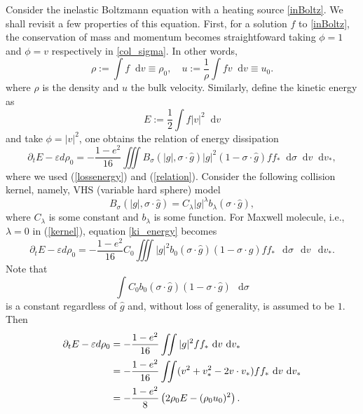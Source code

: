 \documentclass[review, times]{elsarticle}
\newcommand*\diff{\mathop{}\!\mathrm{d}}
\begin{document}
Consider the inelastic Boltzmann equation with a heating source \eqref{inBoltz}. We shall revisit a few properties of this equation. First, for a solution $f$ to \eqref{inBoltz}, the conservation of mass and momentum becomes straightfoward taking $\phi = 1$ and $\phi = v$ respectively in \eqref{col_sigma}. In other words,
\begin{equation}
\rho := \int f\diff{v}\equiv \rho_0, \quad  u :=\frac{1}{\rho}\int fv \diff{v}\equiv u_0.
\end{equation}
where $\rho$ is the density and $u$ the bulk velocity. Similarly, define the kinetic energy as
\begin{equation}
  E := \frac{1}{2}\int f |v|^2\diff v
\end{equation}
and take $\phi = |v|^2$, one obtains the relation of energy dissipation
\begin{equation}\label{ki_energy}
\partial_t E -\varepsilon d\rho_0=-\frac{1-e^2}{16}\iiint B_{\sigma}(|g|,\sigma\cdot \hat{g})|g|^2(1-\sigma\cdot \hat{g})ff_*\diff{\sigma}\diff{v}\diff{v_*},
\end{equation}
where we used (\ref{lossenergy}) and (\ref{relation}). Consider the following collision kernel, namely, VHS (variable hard sphere) model
\begin{equation} \label{kernel}
B_{\sigma}(|g|,\sigma\cdot \hat{g})=C_{\lambda}|g|^{\lambda}b_{\lambda}(\sigma\cdot \hat{g}),
\end{equation}
where $C_{\lambda}$ is some constant and $b_{\lambda}$ is some function. For Maxwell molecule, i.e., $\lambda=0$ in (\ref{kernel}), equation \eqref{ki_energy} becomes
\begin{equation} 
\partial_t E -\varepsilon d\rho_0=-\frac{1-e^2}{16}C_0\iiint |g|^{2}b_0(\sigma\cdot \hat{g})(1-\sigma\cdot \hat{g})ff_*\,\diff{\sigma}\,\diff{v}\,\diff{v_*}.
\end{equation}
Note that
\begin{equation}
\int C_0b_0(\sigma\cdot \hat{g})(1-\sigma\cdot \hat{g})\,\diff{\sigma}
\end{equation}
is a constant regardless of $\hat{g}$ and, without loss of generality, is assumed to be $1$. Then
\begin{align} 
  \partial_t E -\varepsilon d\rho_0 &=-\frac{1-e^2}{16}\iint |g|^{2}ff_*\,\diff{v}\,\diff{v_*} \notag\\
   & =-\frac{1-e^2}{16}\iint (v^2+v_*^2-2v\cdot v_*)ff_*\,\diff{v}\,\diff{v_*} \notag \\
   &=-\frac{1-e^2}{8}\left(2\rho_0E - (\rho_0 u_0)^2\right).
\end{align}
\end{document}
